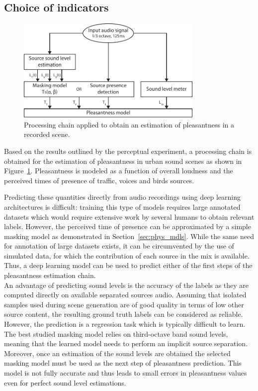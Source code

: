 \documentclass[11pt,a4paper]{article}
\begin{document}
\subsection{Choice of indicators}
\label{sec:pred_inds}

\begin{figure}[!h]
    \centering
    \includegraphics[width=0.8\textwidth]{figures/ppred.pdf}
    \caption{Processing chain applied to obtain an estimation of pleasantness in a recorded scene.}\label{fig:ppred}
\end{figure}

Based on the results outlined by the perceptual experiment, a processing chain is obtained for the estimation of pleasantness in urban sound scenes as shown in Figure~\ref{fig:ppred}. Pleasantness is modeled as a function of overall loudness and the perceived times of presence of traffic, voices and birds sources.

Predicting these quantities directly from audio recordings using deep learning architectures is difficult: training this type of models requires large annotated datasets which would require extensive work by several humans to obtain relevant labels. However, the perceived time of presence can be approximated by a simple masking model as demonstrated in Section~\ref{sec:phys_mdls}. While the same need for annotation of large datasets exists, it can be circumvented by the use of simulated data, for which the contribution of each source in the mix is available. Thus, a deep learning model can be used to predict either of the first steps of the pleasantness estimation chain.\\

An advantage of predicting sound levels is the accuracy of the labels as they are computed directly on available separated sources audio. Assuming that isolated samples used during scene generation are of good quality in terms of low other source content, the resulting ground truth labels can be considered as reliable. However, the prediction is a regression task which is typically difficult to learn. The best studied masking model relies on third-octave band sound levels, meaning that the learned model needs to perform an implicit source separation. Moreover, once an estimation of the sound levels are obtained the selected masking model must be used as the next step of pleasantness prediction. This model is not fully accurate and thus leads to small errors in pleasantness values even for perfect sound level estimations.\\
\end{document}
